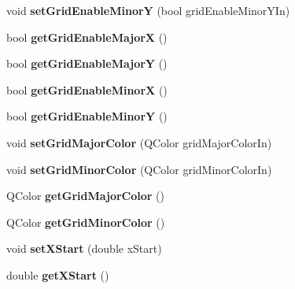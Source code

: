 \begin{DoxyCompactItemize}
\item 
\hypertarget{classQEPlot_af473ff4d41465aa30e868704cc6d2c86}{
void {\bfseries setGridEnableMinorY} (bool gridEnableMinorYIn)}
\label{classQEPlot_af473ff4d41465aa30e868704cc6d2c86}

\item 
\hypertarget{classQEPlot_a4a6aead84c4f7afe159166907b8c14fa}{
bool {\bfseries getGridEnableMajorX} ()}
\label{classQEPlot_a4a6aead84c4f7afe159166907b8c14fa}

\item 
\hypertarget{classQEPlot_ac1040d567f6a0df7c4c5e598df487e59}{
bool {\bfseries getGridEnableMajorY} ()}
\label{classQEPlot_ac1040d567f6a0df7c4c5e598df487e59}

\item 
\hypertarget{classQEPlot_a8d4cdec3a306153d9e8e79f92996d93d}{
bool {\bfseries getGridEnableMinorX} ()}
\label{classQEPlot_a8d4cdec3a306153d9e8e79f92996d93d}

\item 
\hypertarget{classQEPlot_a9ca6f820e870b5120acae69bb9741a95}{
bool {\bfseries getGridEnableMinorY} ()}
\label{classQEPlot_a9ca6f820e870b5120acae69bb9741a95}

\item 
\hypertarget{classQEPlot_a4298ba419be45201efba5bc5d2629e0b}{
void {\bfseries setGridMajorColor} (QColor gridMajorColorIn)}
\label{classQEPlot_a4298ba419be45201efba5bc5d2629e0b}

\item 
\hypertarget{classQEPlot_a88c60ddb5ee1e9f29a034e1c395674ff}{
void {\bfseries setGridMinorColor} (QColor gridMinorColorIn)}
\label{classQEPlot_a88c60ddb5ee1e9f29a034e1c395674ff}

\item 
\hypertarget{classQEPlot_a5a9d48eb2935855efd7d45c7614df7ca}{
QColor {\bfseries getGridMajorColor} ()}
\label{classQEPlot_a5a9d48eb2935855efd7d45c7614df7ca}

\item 
\hypertarget{classQEPlot_a448a46d5346df3f26656c156e4a4d598}{
QColor {\bfseries getGridMinorColor} ()}
\label{classQEPlot_a448a46d5346df3f26656c156e4a4d598}

\item 
\hypertarget{classQEPlot_a769fafe9112421cc140ac7fc94454da2}{
void {\bfseries setXStart} (double xStart)}
\label{classQEPlot_a769fafe9112421cc140ac7fc94454da2}

\item 
\hypertarget{classQEPlot_a21848257ab8d14ae22ccdd5ab6c53307}{
double {\bfseries getXStart} ()}
\label{classQEPlot_a21848257ab8d14ae22ccdd5ab6c53307}


\end{DoxyCompactItemize}
